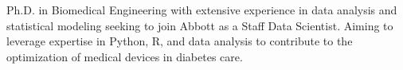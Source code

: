 \small{
Ph.D. in Biomedical Engineering with extensive experience in data analysis and statistical modeling seeking to join Abbott as a Staff Data Scientist. Aiming to leverage expertise in Python, R, and data analysis to contribute to the optimization of medical devices in diabetes care.
}